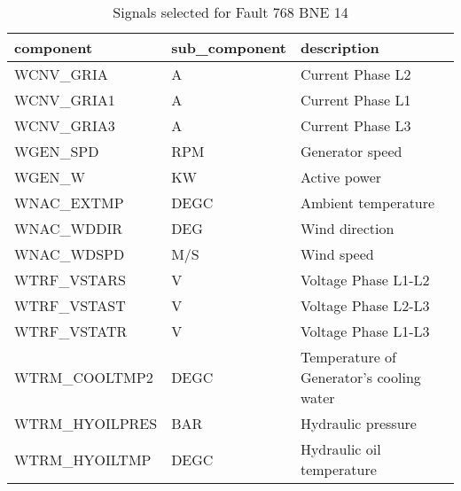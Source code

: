 \begin{table}[h!t]
    \centering
    \begin{tabular}{|l|l|l|}
    \hline
        component & sub\_component & description \\ \hline
        WCNV\_GRIA & A & Current Phase L2 \\ \hline
        WCNV\_GRIA1 & A & Current Phase L1 \\ \hline
        WCNV\_GRIA3 & A & Current Phase L3 \\ \hline
        WGEN\_SPD & RPM & Generator speed \\ \hline
        WGEN\_W & KW & Active power \\ \hline
        WNAC\_EXTMP & DEGC & Ambient temperature \\ \hline
        WNAC\_WDDIR & DEG & Wind direction \\ \hline
        WNAC\_WDSPD & M/S & Wind speed \\ \hline
        WTRF\_VSTARS & V & Voltage Phase L1-L2 \\ \hline
        WTRF\_VSTAST & V & Voltage Phase L2-L3 \\ \hline
        WTRF\_VSTATR & V & Voltage Phase L1-L3 \\ \hline
        WTRM\_COOLTMP2 & DEGC & Temperature of Generator's cooling water \\ \hline
        WTRM\_HYOILPRES & BAR & Hydraulic pressure \\ \hline
        WTRM\_HYOILTMP & DEGC & Hydraulic oil temperature \\ \hline
    \end{tabular}
    \caption{Signals selected for Fault 768 BNE 14}
\end{table}

